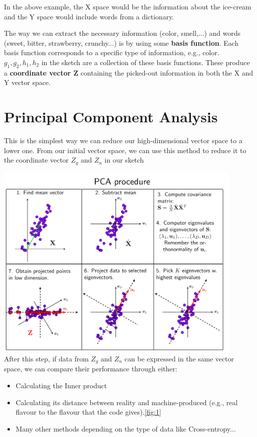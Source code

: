 \documentclass{article}
\begin{document}
In the above example, the X space would be the information about the ice-cream and the Y space would include words from a dictionary. 

The way we can extract the necessary information (color, smell,...) and words (sweet, bitter, strawberry, crunchy...) is by using some \textbf{basis function}. Each basis function corresponds to a specific type of information, e.g., color. \textbf{$g_1, g_2, h_1, h_2$} in the sketch are a collection of these basis functions. These produce a \textbf{coordinate vector Z} containing the picked-out information in both the X and Y vector space.

\section{Principal Component Analysis}

This is the simplest way we can reduce our high-dimensional vector space to a lower one. From our initial vector space, we can use this method to reduce it to the coordinate vector $Z_g$ and $Z_n$ in our sketch

\includegraphics[width=12cm]{Capture.PNG}\\

After this step, if data from $Z_g$ and $Z_n$ can be expressed in the same vector space, we can compare their performance through either:
\begin{itemize}
  \item Calculating the Inner product 
  \item Calculating its distance between reality and machine-produced (e.g., real flavour to the flavour that the code gives).\ref{fig:1} 
  \item Many other methods depending on the type of data like Cross-entropy...
\end{itemize}
\end{document}
